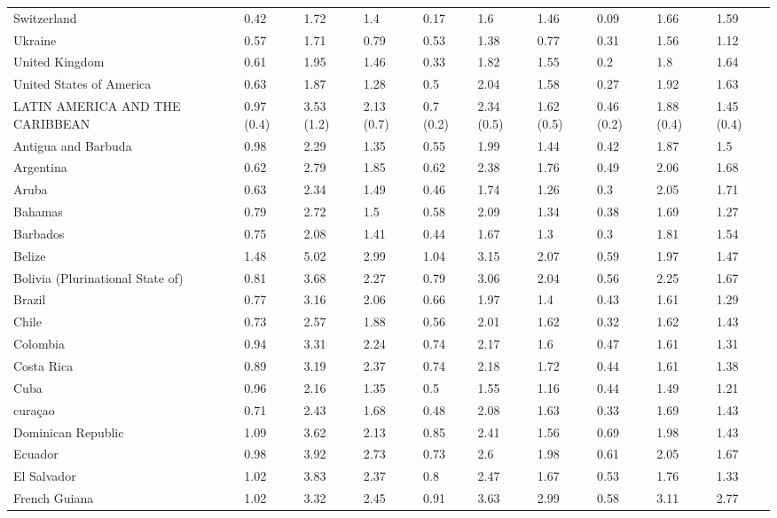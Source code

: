\begin{longtable}[t]{llllllllll}
Switzerland & 0.42 & 1.72 & 1.4 & 0.17 & 1.6 & 1.46 & 0.09 & 1.66 & 1.59\\
Ukraine & 0.57 & 1.71 & 0.79 & 0.53 & 1.38 & 0.77 & 0.31 & 1.56 & 1.12\\
United Kingdom & 0.61 & 1.95 & 1.46 & 0.33 & 1.82 & 1.55 & 0.2 & 1.8 & 1.64\\
United States of America & 0.63 & 1.87 & 1.28 & 0.5 & 2.04 & 1.58 & 0.27 & 1.92 & 1.63\\
LATIN AMERICA AND THE CARIBBEAN & 0.97 (0.4) & 3.53 (1.2) & 2.13 (0.7) & 0.7 (0.2) & 2.34 (0.5) & 1.62 (0.5) & 0.46 (0.2) & 1.88 (0.4) & 1.45 (0.4)\\
Antigua and Barbuda & 0.98 & 2.29 & 1.35 & 0.55 & 1.99 & 1.44 & 0.42 & 1.87 & 1.5\\
Argentina & 0.62 & 2.79 & 1.85 & 0.62 & 2.38 & 1.76 & 0.49 & 2.06 & 1.68\\
Aruba & 0.63 & 2.34 & 1.49 & 0.46 & 1.74 & 1.26 & 0.3 & 2.05 & 1.71\\
Bahamas & 0.79 & 2.72 & 1.5 & 0.58 & 2.09 & 1.34 & 0.38 & 1.69 & 1.27\\
Barbados & 0.75 & 2.08 & 1.41 & 0.44 & 1.67 & 1.3 & 0.3 & 1.81 & 1.54\\
Belize & 1.48 & 5.02 & 2.99 & 1.04 & 3.15 & 2.07 & 0.59 & 1.97 & 1.47\\
Bolivia (Plurinational State of) & 0.81 & 3.68 & 2.27 & 0.79 & 3.06 & 2.04 & 0.56 & 2.25 & 1.67\\
Brazil & 0.77 & 3.16 & 2.06 & 0.66 & 1.97 & 1.4 & 0.43 & 1.61 & 1.29\\
Chile & 0.73 & 2.57 & 1.88 & 0.56 & 2.01 & 1.62 & 0.32 & 1.62 & 1.43\\
Colombia & 0.94 & 3.31 & 2.24 & 0.74 & 2.17 & 1.6 & 0.47 & 1.61 & 1.31\\
Costa Rica & 0.89 & 3.19 & 2.37 & 0.74 & 2.18 & 1.72 & 0.44 & 1.61 & 1.38\\
Cuba & 0.96 & 2.16 & 1.35 & 0.5 & 1.55 & 1.16 & 0.44 & 1.49 & 1.21\\
curaçao & 0.71 & 2.43 & 1.68 & 0.48 & 2.08 & 1.63 & 0.33 & 1.69 & 1.43\\
Dominican Republic & 1.09 & 3.62 & 2.13 & 0.85 & 2.41 & 1.56 & 0.69 & 1.98 & 1.43\\
Ecuador & 0.98 & 3.92 & 2.73 & 0.73 & 2.6 & 1.98 & 0.61 & 2.05 & 1.67\\
El Salvador & 1.02 & 3.83 & 2.37 & 0.8 & 2.47 & 1.67 & 0.53 & 1.76 & 1.33\\
French Guiana & 1.02 & 3.32 & 2.45 & 0.91 & 3.63 & 2.99 & 0.58 & 3.11 & 2.77\\

\end{longtable}
